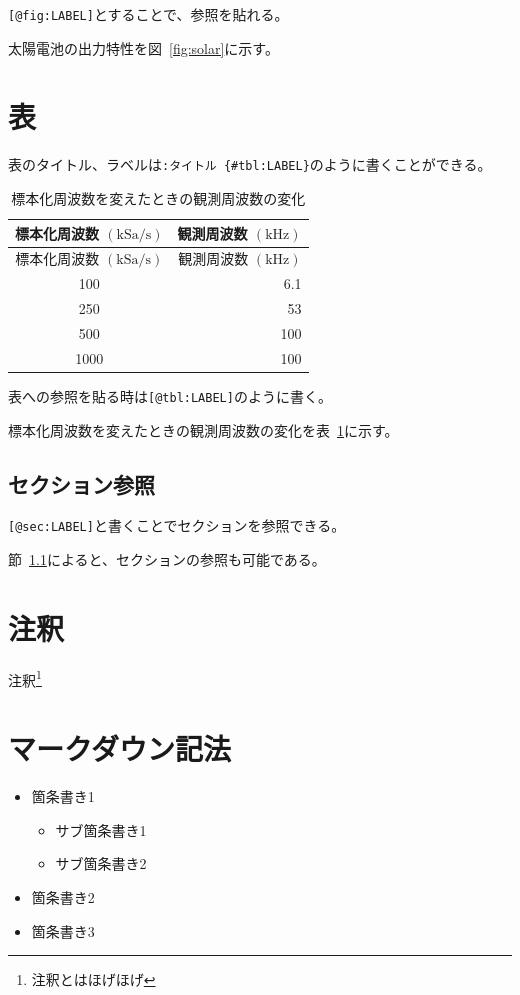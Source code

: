 \documentclass[
]{ltjarticle}
\providecommand{\tightlist}{%
  \setlength{\itemsep}{0pt}\setlength{\parskip}{0pt}}
\begin{document}
\texttt{{[}@fig:LABEL{]}}とすることで、参照を貼れる。

太陽電池の出力特性を図~\ref{fig:solar}に示す。

\hypertarget{ux8868}{%
\section{表}\label{ux8868}}

表のタイトル、ラベルは\texttt{:タイトル\ \{\#tbl:LABEL\}}のように書くことができる。

\hypertarget{tbl:table}{}
\begin{longtable}[]{@{}cr@{}}
\caption{\label{tbl:table}標本化周波数を変えたときの観測周波数の変化}\tabularnewline
\toprule
標本化周波数 \(\mathrm{(kSa/s)}\) & 観測周波数
\(\mathrm{(kHz)}\)\tabularnewline
\midrule
\endfirsthead
\toprule
標本化周波数 \(\mathrm{(kSa/s)}\) & 観測周波数
\(\mathrm{(kHz)}\)\tabularnewline
\midrule
\endhead
100 & 6.1\tabularnewline
250 & 53\tabularnewline
500 & 100\tabularnewline
1000 & 100\tabularnewline
\bottomrule
\end{longtable}

表への参照を貼る時は\texttt{{[}@tbl:LABEL{]}}のように書く。

標本化周波数を変えたときの観測周波数の変化を表~\ref{tbl:table}に示す。

\hypertarget{sec:section}{%
\subsection{セクション参照}\label{sec:section}}

\texttt{{[}@sec:LABEL{]}}と書くことでセクションを参照できる。

節~\ref{sec:section}によると、セクションの参照も可能である。

\hypertarget{ux6ce8ux91c8}{%
\section{注釈}\label{ux6ce8ux91c8}}

注釈\footnote{注釈とはほげほげ}

\hypertarget{ux30deux30fcux30afux30c0ux30a6ux30f3ux8a18ux6cd5}{%
\section{マークダウン記法}\label{ux30deux30fcux30afux30c0ux30a6ux30f3ux8a18ux6cd5}}

\begin{itemize}
\tightlist
\item
  箇条書き1

  \begin{itemize}
  \tightlist
  \item
    サブ箇条書き1
  \item
    サブ箇条書き2
  \end{itemize}
\item
  箇条書き2
\item
  箇条書き3
\end{itemize}
\end{document}
